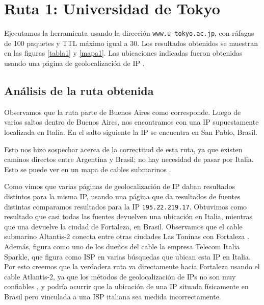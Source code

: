 \section{Ruta 1: Universidad de Tokyo}

Ejecutamos la herramienta usando la dirección \texttt{www.u-tokyo.ac.jp}, con ráfagas de 100 paquetes y TTL máximo igual a 30. Los resultados obtenidos se muestran en las figuras \ref{tabla1} y \ref{mapa1}. Las ubicaciones indicadas fueron obtenidas usando una página de geolocalización de IP \cite{ip2location}.

\subsection{Análisis de la ruta obtenida}
Observamos que la ruta parte de Buenos Aires como corresponde. Luego de varios saltos dentro de Buenos Aires, nos encontramos con una IP supuestamente localizada en Italia. En el salto siguiente la IP se encuentra en San Pablo, Brasil.

Esto nos hizo sospechar acerca de la correctitud de esta ruta, ya que existen caminos directos entre Argentina y Brasil; no hay necesidad de pasar por Italia. Esto se puede ver en un mapa de cables submarinos \cite{cables}.

Como vimos que varias páginas de geolocalización de IP daban resultados distintos para la misma IP, usando una página que da resultados de fuentes distintas \cite{iplocation} comparamos resultados para la IP \texttt{195.22.219.17}. Obtuvimos como resultado que casi todas las fuentes devuelven una ubicación en Italia, mientras que una devuelve la ciudad de Fortaleza, en Brasil. Observamos que el cable submarino Altantis-2 conecta entre otras ciudades Las Toninas con Fortaleza \cite{atlantis2}. Además, figura como uno de los dueños del cable la empresa Telecom Italia Sparkle, que figura como ISP en varias búsquedas que ubican esta IP en Italia. Por esto creemos que la verdadera ruta va directamente hacia Fortaleza usando el cable Atlantis-2, ya que los métodos de geolocalización de IPs no son muy confiables \cite{accuracy}, y podría ocurrir que la ubicación de una IP situada físicamente en Brasil pero vinculada a una ISP italiana sea medida incorrectamente.



